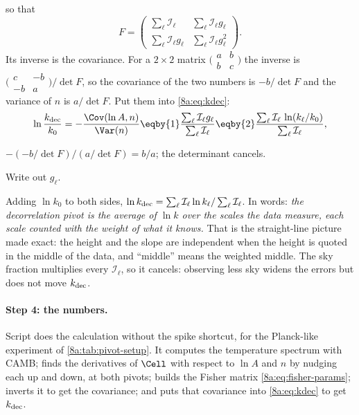 so that
\[
  F=\begin{pmatrix}\sum_\ell \mathcal I_\ell & \sum_\ell \mathcal I_\ell g_\ell\\[2pt] \sum_\ell \mathcal I_\ell g_\ell & \sum_\ell \mathcal I_\ell g_\ell^2\end{pmatrix}.
\]
Its inverse is the covariance. For a $2\times2$ matrix
$\bigl(\begin{smallmatrix}a&b\\b&c\end{smallmatrix}\bigr)$ the inverse is
$\bigl(\begin{smallmatrix}c&-b\\-b&a\end{smallmatrix}\bigr)/\det F$, so the covariance of the two
numbers is $-b/\det F$ and the variance of $n$ is $a/\det F$. Put them into \eqref{8a:eq:kdec}:
\[
  \ln\frac{k_{\rm dec}}{k_0}=-\frac{\Cov(\ln A,n)}{\Var(n)}
  \eqby{1}\frac{\sum_\ell \mathcal I_\ell g_\ell}{\sum_\ell \mathcal I_\ell}
  \eqby{2}\frac{\sum_\ell \mathcal I_\ell\,\ln(k_\ell/k_0)}{\sum_\ell \mathcal I_\ell},
\]
\begin{explain}
  \item $-(-b/\det F)/(a/\det F)=b/a$; the determinant cancels.
  \item Write out $g_\ell$.
\end{explain}
Adding $\ln k_0$ to both sides, $\ln k_{\rm dec}=\sum_\ell \mathcal I_\ell\ln k_\ell/\sum_\ell \mathcal I_\ell$. In words:
\emph{the decorrelation pivot is the average of $\ln k$ over the scales the data measure, each
scale counted with the weight of what it knows.} That is the straight-line picture made exact:
the height and the slope are independent when the height is quoted in the middle of the data,
and ``middle'' means the weighted middle. The sky fraction multiplies every $\mathcal I_\ell$, so it
cancels: observing less sky widens the errors but does not move $k_{\rm dec}$.

\paragraph{Step 4: the numbers.}
Script  does the calculation without the spike shortcut, for the Planck-like
experiment of \cref{8a:tab:pivot-setup}. It computes the temperature spectrum with CAMB; finds the
derivatives of $\Cell$ with respect to $\ln A$ and $n$ by nudging each up and down, at both pivots;
builds the Fisher matrix \eqref{8a:eq:fisher-params}; inverts it to get the covariance; and puts
that covariance into \eqref{8a:eq:kdec} to get $k_{\rm dec}$.

